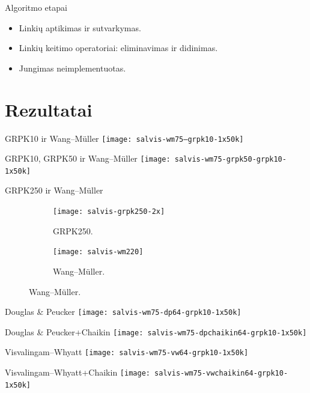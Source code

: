 \documentclass[14pt]{beamer}
\newcommand{\DP}{Douglas \& Peucker}
\newcommand{\VW}{Visvalingam--Whyatt}
\newcommand{\WM}{Wang--M{\"u}ller}
\begin{document}
\begin{frame}{Algoritmo etapai}
  \begin{itemize}
    \item Linkių aptikimas ir sutvarkymas.
    \item Linkių keitimo operatoriai: eliminavimas ir didinimas.
    \item Jungimas neimplementuotas.
  \end{itemize}
\end{frame}

\section{Rezultatai}

\begin{frame}{GRPK10 ir {\WM}}
  \texttt{[image: salvis-wm75--grpk10-1x50k]}
\end{frame}

\begin{frame}{GRPK10, GRPK50 ir {\WM}}
  \texttt{[image: salvis-wm75-grpk50-grpk10-1x50k]}
\end{frame}

\begin{frame}{GRPK250 ir {\WM}}
  \begin{figure}[h!]
    \centering
    \begin{subfigure}[b]{.49\textwidth}
      \texttt{[image: salvis-grpk250-2x]}
      \caption{GRPK250.}
    \end{subfigure}
    \hfill
    \begin{subfigure}[b]{.49\textwidth}
      \centering
      \texttt{[image: salvis-wm220]}
      \caption{{\WM}.}
    \end{subfigure}
  \end{figure}
\end{frame}

\begin{frame}{{\DP}}
  \texttt{[image: salvis-wm75-dp64-grpk10-1x50k]}
\end{frame}

\begin{frame}{{\DP}+Chaikin}
  \texttt{[image: salvis-wm75-dpchaikin64-grpk10-1x50k]}
\end{frame}

\begin{frame}{{\VW}}
  \texttt{[image: salvis-wm75-vw64-grpk10-1x50k]}
\end{frame}

\begin{frame}{{\VW}+Chaikin}
  \texttt{[image: salvis-wm75-vwchaikin64-grpk10-1x50k]}
\end{frame}
\end{document}
